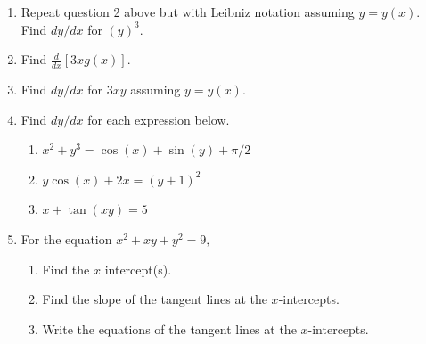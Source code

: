 \documentclass[11pt,fleqn]{article}
\begin{document}
\begin{enumerate}
 \vfill
 
 \item Repeat question 2 above but with Leibniz notation assuming $y=y(x).$ Find $dy/dx$ for \large{${\displaystyle{\left(y \right)^3}}$}.\\
 
  \vfill
 
 \item Find \large{${\displaystyle{ \frac{d}{dx} \left[3xg(x) \right] }}$}.\\
 
  \vfill
 
 \item Find $dy/dx$ for \large{${\displaystyle{3xy}}$} assuming $y=y(x).$\\
 
  \vfill
  
  \newpage
  \item Find $dy/dx$ for each expression below.
  	\begin{enumerate}
	\item $x^2+y^3=\cos(x)+\sin(y) + \pi/2$
	\vfill
	\item $y \cos(x) +2x=(y+1)^2$
	\vfill
	\item $x+\tan(xy)=5$
	\vfill
	\end{enumerate}

\item For the equation $x^2+xy+y^2=9,$ 
	\begin{enumerate}
	\item Find the $x$ intercept(s).
	\vspace{.7in}
	\item Find the slope of the tangent lines at the $x$-intercepts.
	\vfill
	\item Write the equations of the tangent lines at the $x$-intercepts.
	\vspace{.5in}
	\end{enumerate} 
 


\end{enumerate}
\end{document}

